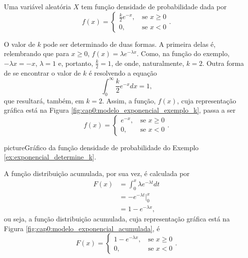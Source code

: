 \begin{example}
	\label{ex:exponencial_determine_k}
	Uma variável aleatória $X$ tem função densidade de probabilidade dada por
	\[
		f(x)=\begin{cases}
			\frac{k}{2}e^{-x}\text{,}&\text{ se }x\geqslant 0\\
			0\text{,}&\text{ se }x<0
		\end{cases}
		\text{.}
	\]
	
	O valor de $k$ pode ser determinado de duas formas. A primeira delas é, relembrando que para $x\geqslant 0$, $f(x)=\lambda e^{-\lambda x}$. Como, na função do exemplo, $-\lambda x=-x$, $\lambda=1$ e, portanto, $\frac{k}{2}=1$, de onde, naturalmente, $k=2$. Outra forma de se encontrar o valor de $k$ é resolvendo a equação
	\[
		\int_{0}^{\infty} \frac{k}{2}e^{-x}dx=1
		\text{,}
	\]
	que resultará, também, em $k=2$. Assim, a função, $f(x)$, cuja representação gráfica está na Figura \ref{fig:cap0:modelo_exponencial_exemplo_k}, passa a ser
	\[
		f(x)=\begin{cases}
			e^{-x}\text{,}&\text{ se }x\geqslant 0\\
			0\text{,}&\text{ se }x<0
		\end{cases}
		\text{.}
	\]
\end{example}

\begin{sidepicture}{0cm}{picture}{Gráfico da função densidade de probabilidade do Exemplo \ref{ex:exponencial_determine_k}.}
	\label{fig:cap0:modelo_exponencial_exemplo_k}
\end{sidepicture}

A função distribuição acumulada, por sua vez, é calculada por
\begin{align*}
	F(x)&=\int_{0}^{x} \lambda e^{-\lambda t} dt\\
		&=-e^{-\lambda t}\Big|_{0}^{x}\\
		&=1-e^{-\lambda x}\text{,}
\end{align*}
ou seja, a função distribuição acumulada, cuja representação gráfica está na Figura \ref{fig:cap0:modelo_exponencial_acumulada}, é
\[
	F(x)=\begin{cases}
		1-e^{-\lambda x}\text{,}&\text{ se }x\geqslant 0\\
		0\text{,}&\text{ se }x<0
	\end{cases}
	\text{.}
\]

